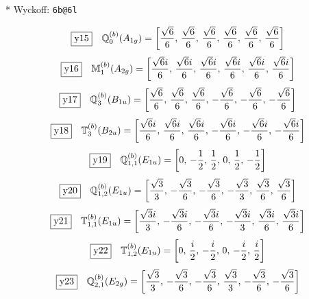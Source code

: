 \documentclass[fleqn,10pt,landscape]{jsarticle}
\begin{document}
\noindent ** Wyckoff: \texttt{6b@6l}

\begin{dmath*}
\fbox{y15}\quad \mathbb{Q}_{0}^{(b)}(A_{1g})=\left[ \frac{\sqrt{6}}{6},\, \frac{\sqrt{6}}{6},\, \frac{\sqrt{6}}{6},\, \frac{\sqrt{6}}{6},\, \frac{\sqrt{6}}{6},\, \frac{\sqrt{6}}{6} \right]
\end{dmath*}
\begin{dmath*}
\fbox{y16}\quad \mathbb{M}_{1}^{(b)}(A_{2g})=\left[ \frac{\sqrt{6} i}{6},\, \frac{\sqrt{6} i}{6},\, \frac{\sqrt{6} i}{6},\, \frac{\sqrt{6} i}{6},\, \frac{\sqrt{6} i}{6},\, \frac{\sqrt{6} i}{6} \right]
\end{dmath*}
\begin{dmath*}
\fbox{y17}\quad \mathbb{Q}_{3}^{(b)}(B_{1u})=\left[ \frac{\sqrt{6}}{6},\, \frac{\sqrt{6}}{6},\, \frac{\sqrt{6}}{6},\, - \frac{\sqrt{6}}{6},\, - \frac{\sqrt{6}}{6},\, - \frac{\sqrt{6}}{6} \right]
\end{dmath*}
\begin{dmath*}
\fbox{y18}\quad \mathbb{T}_{3}^{(b)}(B_{2u})=\left[ \frac{\sqrt{6} i}{6},\, \frac{\sqrt{6} i}{6},\, \frac{\sqrt{6} i}{6},\, - \frac{\sqrt{6} i}{6},\, - \frac{\sqrt{6} i}{6},\, - \frac{\sqrt{6} i}{6} \right]
\end{dmath*}
\begin{dmath*}
\fbox{y19}\quad \mathbb{Q}_{1,1}^{(b)}(E_{1u})=\left[ 0,\, - \frac{1}{2},\, \frac{1}{2},\, 0,\, \frac{1}{2},\, - \frac{1}{2} \right]
\end{dmath*}
\begin{dmath*}
\fbox{y20}\quad \mathbb{Q}_{1,2}^{(b)}(E_{1u})=\left[ \frac{\sqrt{3}}{3},\, - \frac{\sqrt{3}}{6},\, - \frac{\sqrt{3}}{6},\, - \frac{\sqrt{3}}{3},\, \frac{\sqrt{3}}{6},\, \frac{\sqrt{3}}{6} \right]
\end{dmath*}
\begin{dmath*}
\fbox{y21}\quad \mathbb{T}_{1,1}^{(b)}(E_{1u})=\left[ \frac{\sqrt{3} i}{3},\, - \frac{\sqrt{3} i}{6},\, - \frac{\sqrt{3} i}{6},\, - \frac{\sqrt{3} i}{3},\, \frac{\sqrt{3} i}{6},\, \frac{\sqrt{3} i}{6} \right]
\end{dmath*}
\begin{dmath*}
\fbox{y22}\quad \mathbb{T}_{1,2}^{(b)}(E_{1u})=\left[ 0,\, \frac{i}{2},\, - \frac{i}{2},\, 0,\, - \frac{i}{2},\, \frac{i}{2} \right]
\end{dmath*}
\begin{dmath*}
\fbox{y23}\quad \mathbb{Q}_{2,1}^{(b)}(E_{2g})=\left[ \frac{\sqrt{3}}{3},\, - \frac{\sqrt{3}}{6},\, - \frac{\sqrt{3}}{6},\, \frac{\sqrt{3}}{3},\, - \frac{\sqrt{3}}{6},\, - \frac{\sqrt{3}}{6} \right]
\end{dmath*}
\end{document}
